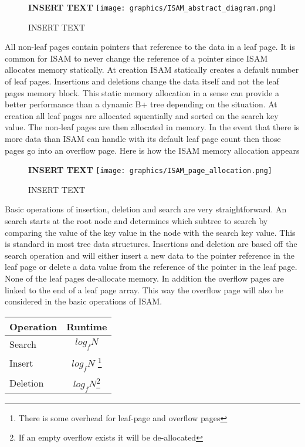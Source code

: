 \documentclass[letterpaper, 12pt]{article}
\begin{document}
\begin{figure}
  \centering
  \textbf{INSERT TEXT}
  \texttt{[image: graphics/ISAM\_abstract\_diagram.png]}
  \caption{INSERT TEXT}
\end{figure}

All non-leaf pages contain pointers that reference to the data in a leaf page. It is common for
ISAM to never change the reference of a pointer since ISAM allocates memory statically. At creation
ISAM statically creates a default number of leaf pages. Insertions and deletions change the data
itself and not the leaf pages memory block. This static memory allocation in a sense can
provide a better performance than a dynamic B+ tree depending on the situation. At creation all
leaf pages are allocated squentially and sorted on the search key value. The non-leaf pages
are then allocated in memory. In the event that there is more data than ISAM can handle with its
default leaf page count then those pages go into an overflow page. Here is how the ISAM memory
allocation appears
\par\vspace{\baselineskip}

\begin{figure}
  \centering
  \textbf{INSERT TEXT}
  \texttt{[image: graphics/ISAM\_page\_allocation.png]}
  \caption{INSERT TEXT}
\end{figure}

Basic operations of insertion, deletion and search are very straightforward. An search starts at the
root node and determines which subtree to search by comparing the value of the key value in the node
with the search key value. This is standard in most tree data structures. Insertions and deletion are
based off the search operation and will either insert a new data to the pointer reference in the leaf
page or delete a data value from the reference of the pointer in the leaf page. None of the leaf
pages de-allocate memory. In addition the overflow pages are linked to the end of a leaf page array.
This way the overflow page will also be considered in the basic operations of ISAM.
\par\vspace{\baselineskip}

\begin{center}
\begin{tabular}{l | c}
  \hline
  Operation & Runtime \\ \hline \hline
  Search & $ log_f N $ \\ \hline
  Insert & $ log_f N $ \footnote{There is some overhead for leaf-page and overflow pages} \\ \hline
  Deletion & $ log_f N $\footnote{If an empty overflow exists it will be de-allocated} \\ \hline
\end{tabular}
\end{center}
\end{document}
